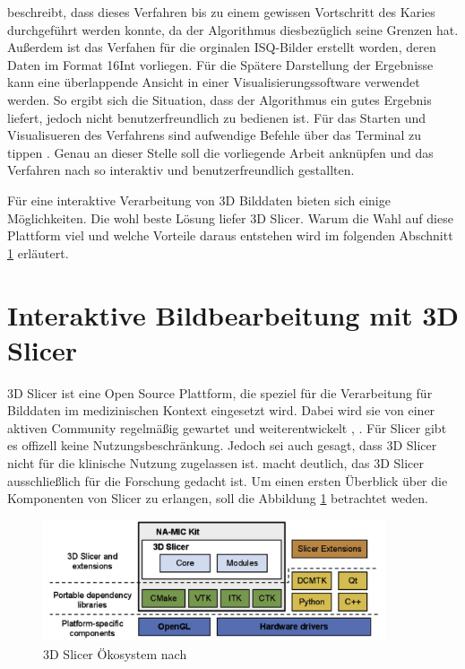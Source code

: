 \citet{hoffmann2020} beschreibt, dass dieses Verfahren bis zu einem gewissen
Vortschritt des Karies durchgeführt werden konnte, da der Algorithmus diesbezüglich
seine Grenzen hat. Außerdem ist das Verfahen für die orginalen ISQ-Bilder
erstellt worden, deren Daten im Format \ac{16Int} vorliegen. Für die Spätere Darstellung
der Ergebnisse kann eine überlappende Ansicht in einer Visualisierungssoftware verwendet
werden. So ergibt sich die Situation, dass der Algorithmus ein gutes Ergebnis liefert,
jedoch nicht benutzerfreundlich zu bedienen ist. Für das Starten und Visualisueren
des Verfahrens sind aufwendige Befehle über das Terminal zu tippen \citep[vgl.][Seite
53]{hoffmann2020}. Genau an dieser Stelle soll die vorliegende Arbeit anknüpfen
und das Verfahren nach \citet{hoffmann2020} so interaktiv und benutzerfreundlich
gestallten.

Für eine interaktive Verarbeitung von 3D Bilddaten bieten sich einige Möglichkeiten.
Die wohl beste Lösung liefer 3D Slicer. Warum die Wahl auf diese Plattform viel und
welche Vorteile daraus entstehen wird im folgenden Abschnitt \ref{sec:3d_slicer}
erläutert.

\section{Interaktive Bildbearbeitung mit 3D Slicer}
\label{sec:3d_slicer} 3D Slicer ist eine Open Source Plattform, die speziel für
die Verarbeitung für Bilddaten im medizinischen Kontext eingesetzt wird. Dabei wird
sie von einer aktiven Community regelmäßig gewartet und weiterentwickelt \citep[vgl.][]{slicer2024},
\citep[vgl.][]{fedorov2012slicer}. Für Slicer gibt es offizell keine Nutzungsbeschränkung.
Jedoch sei auch gesagt, dass 3D Slicer nicht für die klinische Nutzung zugelassen
ist. \citet{fedorov2012slicer} macht deutlich, das 3D Slicer ausschließlich für
die Forschung gedacht ist. Um einen ersten Überblick über die Komponenten von Slicer
zu erlangen, soll die Abbildung \ref{fig:3d_slicer_oekosystem} betrachtet weden.

\begin{figure}[h]
	\centering
	\includegraphics[width=0.9\textwidth]{img/3d_slicer_overview.jpg}
	\caption{3D Slicer Ökosystem nach \citet[Seite 1326]{fedorov2012slicer}}
	\label{fig:3d_slicer_oekosystem}
\end{figure}

